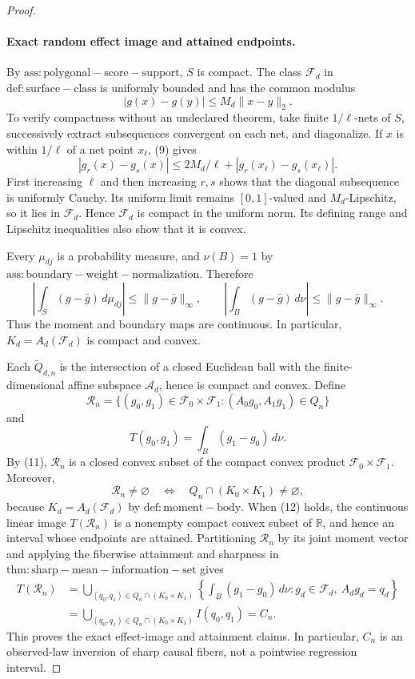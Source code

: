\documentclass{article}
\begin{document}
\begin{proof}
\paragraph{Exact random effect image and attained endpoints.}
By \(\mathrm{ass:polygonal-score-support}\), \(S\) is compact.  The class \(\mathcal F_d\) in \(\mathrm{def:surface-class}\) is uniformly bounded and has the common modulus
\[
 |g(x)-g(y)|\leq M_d\|x-y\|_2.                              \tag{9}
\]
To verify compactness without an undeclared theorem, take finite \(1/\ell\)-nets of \(S\), successively extract subsequences convergent on each net, and diagonalize.  If \(x\) is within \(1/\ell\) of a net point \(x_\ell\), (9) gives
\[
 |g_r(x)-g_s(x)|
 \leq 2M_d/\ell+|g_r(x_\ell)-g_s(x_\ell)|.                \tag{10}
\]
First increasing \(\ell\) and then increasing \(r,s\) shows that the diagonal subsequence is uniformly Cauchy.  Its uniform limit remains \([0,1]\)-valued and \(M_d\)-Lipschitz, so it lies in \(\mathcal F_d\).  Hence \(\mathcal F_d\) is compact in the uniform norm.  Its defining range and Lipschitz inequalities also show that it is convex.

Every \(\mu_{dj}\) is a probability measure, and \(\nu(B)=1\) by \(\mathrm{ass:boundary-weight-normalization}\).  Therefore
\[
 \left|\int_S(g-\bar g)\,d\mu_{dj}\right|
 \leq\|g-\bar g\|_\infty,
 \qquad
 \left|\int_B(g-\bar g)\,d\nu\right|
 \leq\|g-\bar g\|_\infty.                                \tag{11}
\]
Thus the moment and boundary maps are continuous.  In particular, \(K_d=A_d(\mathcal F_d)\) is compact and convex.

Each \(\widetilde Q_{d,n}\) is the intersection of a closed Euclidean ball with the finite-dimensional affine subspace \(\mathcal A_d\), hence is compact and convex.  Define
\[
 \mathcal R_n
 =\{(g_0,g_1)\in\mathcal F_0\times\mathcal F_1:
        (A_0g_0,A_1g_1)\in Q_n\}
\]
and
\[
 T(g_0,g_1)=\int_B(g_1-g_0)\,d\nu.
\]
By (11), \(\mathcal R_n\) is a closed convex subset of the compact convex product \(\mathcal F_0\times\mathcal F_1\).  Moreover,
\[
 \mathcal R_n\neq\varnothing
 \quad\Longleftrightarrow\quad
 Q_n\cap(K_0\times K_1)\neq\varnothing,                   \tag{12}
\]
because \(K_d=A_d(\mathcal F_d)\) by \(\mathrm{def:moment-body}\).  When (12) holds, the continuous linear image \(T(\mathcal R_n)\) is a nonempty compact convex subset of \(\mathbb R\), and hence an interval whose endpoints are attained.  Partitioning \(\mathcal R_n\) by its joint moment vector and applying the fiberwise attainment and sharpness in \(\mathrm{thm:sharp-mean-information-set}\) gives
\[
\begin{aligned}
 T(\mathcal R_n)
 &=\bigcup_{(q_0,q_1)\in Q_n\cap(K_0\times K_1)}
   \left\{\int_B(g_1-g_0)\,d\nu:
       g_d\in\mathcal F_d,\ A_dg_d=q_d\right\}\\
 &=\bigcup_{(q_0,q_1)\in Q_n\cap(K_0\times K_1)}I(q_0,q_1)
 =C_n.                                                       \tag{13}
\end{aligned}
\]
This proves the exact effect-image and attainment claims.  In particular, \(C_n\) is an observed-law inversion of sharp causal fibers, not a pointwise regression interval.


\end{proof}
\end{document}
